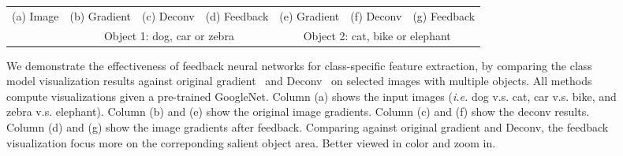 \begin{figure}
\begin{center}
\begin{tabular}{ccccccc}
{\small (a) Image} &
{\small (b) Gradient} &
{\small (c) Deconv} &
{\small (d) Feedback} &
{\small (e) Gradient} &
{\small (f) Deconv} &
{\small (g) Feedback} \\
& \multicolumn{3}{c}{\small Object 1: dog, car or zebra} & \multicolumn{3}{c}{\small Object 2: cat, bike or elephant} \\
\end{tabular}
\caption{We demonstrate the effectiveness of feedback neural networks for class-specific feature extraction, by comparing the class model visualization results against original gradient~\cite{simonyan2013deep} and Deconv~\cite{zeiler2014visualizing} on selected images with multiple objects. All methods compute visualizations given a pre-trained GoogleNet. Column (a) shows the input images (\emph{i.e.} dog v.s. cat, car v.s. bike, and zebra v.s. elephant). Column (b) and (e) show the original image gradients. Column (c) and (f) show the deconv results. Column (d) and (g) show the image gradients after feedback. Comparing against original gradient and Deconv, the feedback visualization focus more on the correponding salient object area. Better viewed in color and zoom in.} 
\label{fig:examples}
\end{center}
\end{figure}

